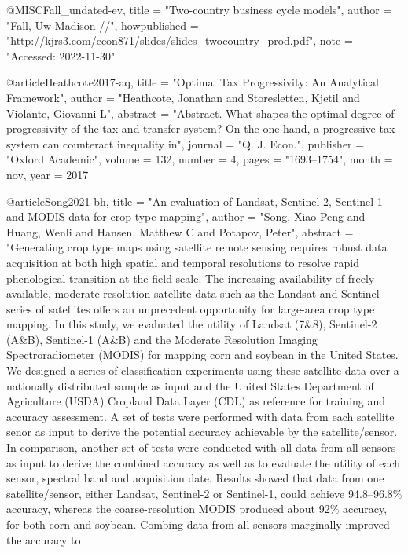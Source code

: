 {@MISC{Fall_undated-ev,
	title        = "Two-country business cycle models",
	author       = "Fall, Uw-Madison //",
	howpublished = "\url{http://kjrs3.com/econ871/slides/slides_twocountry_prod.pdf}",
	note         = "Accessed: 2022-11-30"
}

@article{Heathcote2017-aq,
	title     = "Optimal Tax Progressivity: An Analytical Framework",
	author    = "Heathcote, Jonathan and Storesletten, Kjetil and Violante,
	Giovanni L",
	abstract  = "Abstract. What shapes the optimal degree of progressivity of the
	tax and transfer system? On the one hand, a progressive tax
	system can counteract inequality in",
	journal   = "Q. J. Econ.",
	publisher = "Oxford Academic",
	volume    =  132,
	number    =  4,
	pages     = "1693--1754",
	month     =  nov,
	year      =  2017
}

@article{Song2021-bh,
	title    = "An evaluation of Landsat, Sentinel-2, Sentinel-1 and {MODIS} data
	for crop type mapping",
	author   = "Song, Xiao-Peng and Huang, Wenli and Hansen, Matthew C and
	Potapov, Peter",
	abstract = "Generating crop type maps using satellite remote sensing requires
	robust data acquisition at both high spatial and temporal
	resolutions to resolve rapid phenological transition at the field
	scale. The increasing availability of freely-available,
	moderate-resolution satellite data such as the Landsat and
	Sentinel series of satellites offers an unprecedent opportunity
	for large-area crop type mapping. In this study, we evaluated the
	utility of Landsat (7\&8), Sentinel-2 (A\&B), Sentinel-1 (A\&B)
	and the Moderate Resolution Imaging Spectroradiometer (MODIS) for
	mapping corn and soybean in the United States. We designed a
	series of classification experiments using these satellite data
	over a nationally distributed sample as input and the United
	States Department of Agriculture (USDA) Cropland Data Layer (CDL)
	as reference for training and accuracy assessment. A set of tests
	were performed with data from each satellite senor as input to
	derive the potential accuracy achievable by the satellite/sensor.
	In comparison, another set of tests were conducted with all data
	from all sensors as input to derive the combined accuracy as well
	as to evaluate the utility of each sensor, spectral band and
	acquisition date. Results showed that data from one
	satellite/sensor, either Landsat, Sentinel-2 or Sentinel-1, could
	achieve 94.8--96.8\% accuracy, whereas the coarse-resolution
	MODIS produced about 92\% accuracy, for both corn and soybean.
	Combing data from all sensors marginally improved the accuracy to
}}
